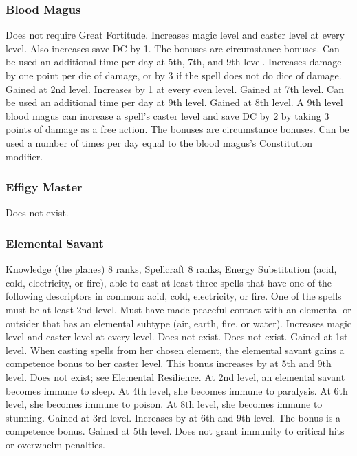 \subsubsection{Blood Magus}
 Does not require Great Fortitude.
 Increases magic level and caster level at every level.
 Also increases save DC by 1. The bonuses are circumstance bonuses.
 Can be used an additional time per day at 5th, 7th, and 9th level.
 Increases damage by one point per die of damage, or by 3 if the spell does not do dice of damage.
 Gained at 2nd level. Increases by 1 at every even level.
 Gained at 7th level. Can be used an additional time per day at 9th level.
 Gained at 8th level.
 A 9th level blood magus can increase a spell's caster level and save DC by 2 by taking 3 points of damage as a free action. The bonuses are circumstance bonuses.
 Can be used a number of times per day equal to the blood magus's Constitution modifier.
\subsubsection{Effigy Master}
Does not exist.
\subsubsection{Elemental Savant}
 Knowledge (the planes) 8 ranks, Spellcraft 8 ranks, Energy Substitution (acid, cold, electricity, or fire), able to cast at least three spells that have one of the following descriptors in common: acid, cold, electricity, or fire. One of the spells must be at least 2nd level. Must have made peaceful contact with an elemental or outsider that has an elemental subtype (air, earth, fire, or water).
 Increases magic level and caster level at every level.
 Does not exist.
 Does not exist.
 Gained at 1st level. When casting spells from her chosen element, the elemental savant gains a  competence bonus to her caster level. This bonus increases by  at 5th and 9th level.
 Does not exist; see Elemental Resilience.
 At 2nd level, an elemental savant becomes immune to sleep. At 4th level, she becomes immune to paralysis. At 6th level, she becomes immune to poison. At 8th level, she becomes immune to stunning.
 Gained at 3rd level. Increases by  at 6th and 9th level. The bonus is a competence bonus.
 Gained at 5th level.
 Does not grant immunity to critical hits or overwhelm penalties.
